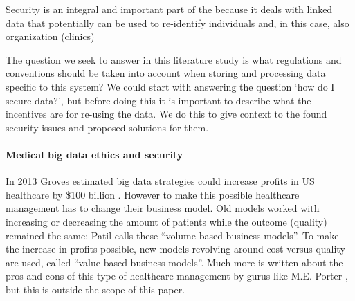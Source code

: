 


Security is an integral and important part of the \ivfsystem{} because it deals with linked data that potentially can be used to re-identify individuals and, in this case, also organization (clinics)

The question we seek to answer in this literature study is what regulations and conventions should be taken into account when storing and processing data specific to this system?
We could start with answering the question `how do I secure data?', but before doing this it is important to describe what the incentives are for re-using the data.
We do this to give context to the found security issues and proposed solutions for them.


\paragraph{Medical big data ethics and security}
\label{security-ethics}


In 2013 Groves \cite{s20Groves2013} estimated big data strategies could increase profits in US healthcare by \$100 billion \cite{s13Patil2014}.
However to make this possible healthcare management has to change their business model.
Old models worked with increasing or decreasing the amount of patients while the outcome (quality) remained the same; Patil \cite{s13Patil2014} calls these ``volume-based business models''.
To make the increase in profits possible, new models revolving around cost versus quality are used, called ``value-based business models''.
Much more is written about the pros and cons of this type of healthcare management by gurus like M.E. Porter \cite{s21Porter2006}, but this is outside the scope of this paper.

